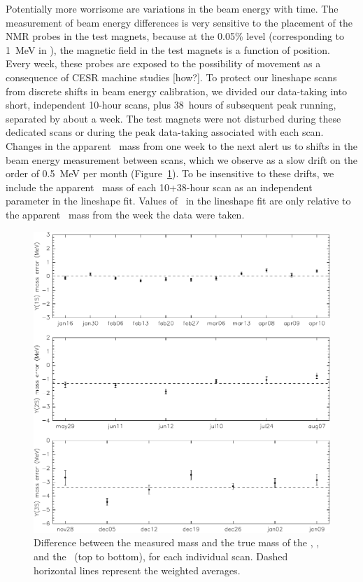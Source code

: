 \documentclass{cornell}
\begin{document}
Potentially more worrisome are variations in the beam energy with
time.  The measurement of beam energy differences is very sensitive to
the placement of the NMR probes in the test magnets, because at the
0.05\% level (corresponding to 1~MeV in \ecm), the magnetic field in
the test magnets is a function of position.  Every week, these probes
are exposed to the possibility of movement as a consequence of CESR
machine studies [how?].  To protect our lineshape scans from discrete
shifts in beam energy calibration, we divided our data-taking into
short, independent 10-hour scans, plus 38~hours of subsequent peak
running, separated by about a week.  The test magnets were not
disturbed during these dedicated scans or during the peak data-taking
associated with each scan.  Changes in the apparent \ups\ mass from
one week to the next alert us to shifts in the beam energy measurement
between scans, which we observe as a slow drift on the order of
0.5~MeV per month (Figure~\ref{beamenergydrift}).  To be insensitive
to these drifts, we include the apparent \ups\ mass of each 10+38-hour
scan as an independent parameter in the lineshape fit.  Values of
\ecm\ in the lineshape fit are only relative to the apparent \ups\
mass from the week the data were taken.

\begin{figure}[p]
  \begin{center}
    \includegraphics[width=\linewidth]{plots/beamenergydrift}
  \end{center}
  \caption{\label{beamenergydrift} Difference between the measured
  mass and the true mass of the \us, \uss, and the \usss\ (top to
  bottom), for each individual scan.  Dashed horizontal lines
  represent the weighted averages.}
\end{figure}
\end{document}
